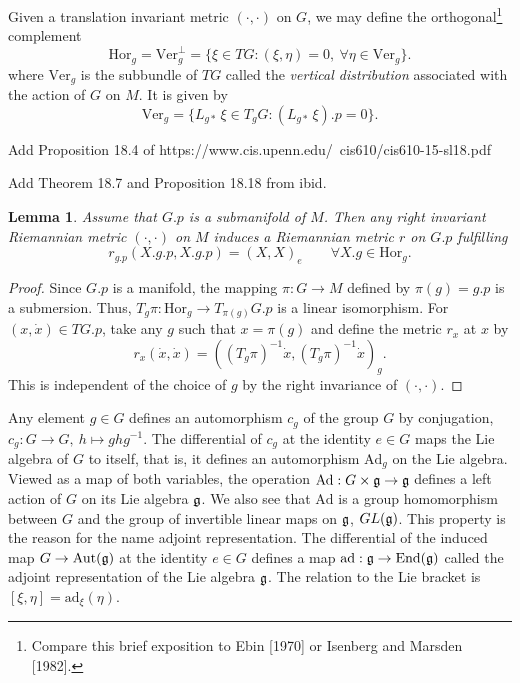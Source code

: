 \documentclass{article}
\theoremstyle{plain}
\newtheorem{lem}[teo]{Lemma}
\theoremstyle{definition}
\numberwithin{equation}{section}
\newcommand{\Ad}{\ensuremath{\mathrm{Ad}}}
\newcommand{\ad}{\ensuremath{\mathrm{ad}}}
\newcommand{\mf}{\ensuremath{\mathfrak}}
\begin{document}
Given a translation invariant metric $(\cdot,\cdot)$ on $G$, we may define the orthogonal\footnote{Compare this brief exposition to Ebin [1970] or Isenberg and Marsden [1982].}  complement
\[
\mathrm{Hor}_g=\mathrm{Ver}_g^\perp=\{\xi\in TG : (\xi,\eta)=0,\ \forall\eta\in\mathrm{Ver}_g\}.
\]
where $\mathrm{Ver}_g$ is the subbundle of $TG$ called the \textit{vertical distribution} associated with the action of $G$ on $M$. It is given by
\[
\mathrm{Ver}_g=\{L_{g*}\,\xi\in T_{g}G : (L_{g*}\,\xi).p=0\}.
\]


Add Proposition 18.4 of https://www.cis.upenn.edu/~cis610/cis610-15-sl18.pdf

Add Theorem 18.7 and Proposition 18.18 from ibid.

\begin{lem}
Assume that $G.p$ is a submanifold of $M$. Then any right invariant Riemannian metric $(\cdot,\cdot)$ on $M$ induces a Riemannian metric $r$ on $G.p$ fulfilling
\[
r_{g.p}(X.g.p,X.g.p)=(X,X)_e \qquad\forall X.g\in\mathrm{Hor}_g.
\]
\end{lem}
\begin{proof}
Since $G.p$ is a manifold, the mapping $\pi:G\to M$ defined by $\pi(g)=g.p$ is a submersion. Thus, $T_g\pi: \mathrm{Hor}_g\to T_{\pi(g)}G.p$ is a linear isomorphism. For $(x,\dot{x})\in TG.p$, take any $g$ such that $x=\pi(g)$ and define the metric $r_x$ at $x$ by
\[
r_x(\dot{x},\dot{x})=\left((T_g\pi)^{-1}\dot{x},(T_g\pi)^{-1}\dot{x}\right)_g.
\]
This is independent of the choice of $g$ by the right invariance of $(\cdot,\cdot)$.
\end{proof}

Any element $g\in G$ defines an automorphism $c_g$ of the group $G$ by conjugation, $c_g:G\to G,\ h\mapsto ghg^{-1}$. The differential of $c_g$ at the identity $e\in G$ maps the Lie algebra of $G$ to itself, that is, it defines an automorphism $\Ad_g$ on the Lie algebra. Viewed as a map of both variables, the operation $\Ad:G\times \mf g\to \mf g$ defines a left action of $G$ on its Lie algebra $\mf g$. We also see that $\Ad$ is a group homomorphism between $G$ and the group of invertible linear maps on $\mf g$, $GL(\mf g)$. This property is the reason for the name adjoint representation. The differential of the induced map $G\to\mathrm{Aut}(\mf g)$ at the identity $e\in G$ defines a map $\ad : \mf g\to \mathrm{End}(\mf g)$ called the adjoint representation of the Lie algebra $\mf g$. The relation to the Lie bracket is $[\xi,\eta]=\ad_\xi(\eta)$.
\end{document}
